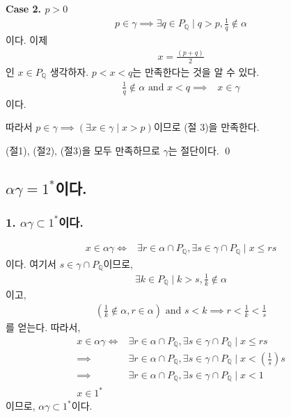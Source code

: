 \documentclass{article}
\begin{document}
\textbf{Case 2. $p > 0$}
\begin{align*}
p \in \gamma \implies \exists q \in P_{\mathbb{Q}} \mid q > p, \frac{1}{q} \notin \alpha
\end{align*}이다. 이제
\begin{align*}
x = \frac{(p + q)}{2} 
\end{align*}인 $ x \in P_{\mathbb{Q}}$ 생각하자. $p < x < q$는 만족한다는 것을 알 수 있다.
\begin{align*}
\frac{1}{q} \notin \alpha  \text{ and } x < q \implies& x \in \gamma
\end{align*}이다. 

따라서 $p \in \gamma \implies \left( \exists  x \in \gamma \mid x > p \right)$이므로 (절 3)을 만족한다.

(절1), (절2), (절3)을 모두 만족하므로 $\gamma$는 절단이다. \qed



\subsection{$\alpha \gamma = 1^*$이다.}
\subsubsection{1. $\alpha \gamma \subset 1^*$이다.}
\begin{align*}
x \in \alpha \gamma \iff& \exists r \in \alpha \cap P_{\mathbb{Q}}, \exists s \in \gamma \cap P_{\mathbb{Q}} \mid x \le rs
\end{align*}이다. 여기서 $s \in \gamma \cap P_{\mathbb{Q}}$이므로,
\begin{align*}
\exists k \in P_{\mathbb{Q}} \mid k > s, \frac{1}{k} \notin \alpha
\end{align*}이고, 
\begin{align*}
\left( \frac{1}{k} \notin \alpha, r \in \alpha \right) \text{ and } s < k \implies r < \frac{1}{k} < \frac{1}{s}
\end{align*}를 얻는다. 따라서,
\begin{align*}
x \in \alpha \gamma \iff& \exists r \in \alpha \cap P_{\mathbb{Q}}, \exists s \in \gamma \cap P_{\mathbb{Q}} \mid x \le rs
\\ \implies & \exists r \in \alpha \cap P_{\mathbb{Q}}, \exists s \in \gamma \cap P_{\mathbb{Q}} \mid x < \left(\frac{1}{s} \right) s
\\ \implies & \exists r \in \alpha \cap P_{\mathbb{Q}}, \exists s \in \gamma \cap P_{\mathbb{Q}} \mid x < 1
\\ x \in 1^*
\end{align*}이므로, $\alpha \gamma \subset 1^*$이다.
\end{document}
